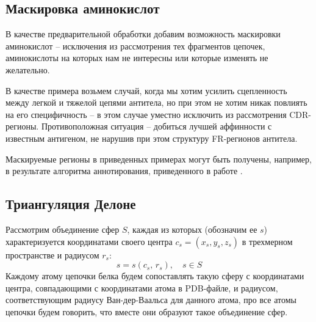 
\subsection{Маскировка аминокислот}
В качестве предварительной обработки добавим возможность маскировки аминокислот -- исключения из рассмотрения тех фрагментов цепочек, аминокислоты на которых нам не интересны или которые изменять не желательно. 

В качестве примера возьмем случай, когда мы хотим усилить сцепленность между легкой и тяжелой цепями антитела, но при этом не хотим никак повлиять на его специфичность -- в этом случае уместно исключить из рассмотрения CDR-регионы. Противоположная ситуация -- добиться лучшей аффинности с известным антигеном, не нарушив при этом структуру FR-регионов антитела.

Маскируемые регионы в приведенных примерах могут быть получены, например, в результате алгоритма аннотирования, приведенного в работе \cite{yakovlev2014}.

\subsection{Триангуляция Делоне}
Рассмотрим объединение сфер $S$, каждая из которых (обозначим ее $s$) характеризуется координатами своего центра $c_s=(x_s, y_s, z_s)$ в трехмерном пространстве и радиусом $r_s$:
$$
s=s(c_s,\,r_s),\quad s\in S
$$
Каждому атому цепочки белка будем сопоставлять такую сферу с координатами центра, совпадающими с координатами атома в PDB-файле, и радиусом, соответствующим радиусу Ван-дер-Ваальса для данного атома, про все атомы цепочки будем говорить, что вместе они образуют такое объединение сфер.

